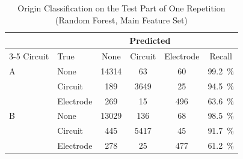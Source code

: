 \begin{table}[!t]
\caption{Origin Classification on the Test Part of One Repetition (Random Forest, Main Feature
Set)}
\label{tab:origin}
\centering
\begin{tabular}{@{}llcccc@{}}
\toprule
 & & \multicolumn{3}{c}{Predicted} & \\
\cmidrule(lr){3-5}
Circuit & True & None & Circuit & Electrode & Recall \\
\midrule
A & None & \num{14314} & 63 & 60 & \SI{99.2}{\percent} \\
 & Circuit & 189 & \num{3649} & 25 & \SI{94.5}{\percent} \\
 & Electrode & 269 & 15 & 496 & \SI{63.6}{\percent} \\
\addlinespace
B & None & \num{13029} & 136 & 68 & \SI{98.5}{\percent} \\
 & Circuit & 445 & \num{5417} & 45 & \SI{91.7}{\percent} \\
 & Electrode & 278 & 25 & 477 & \SI{61.2}{\percent} \\
\bottomrule
\end{tabular}
\end{table}
